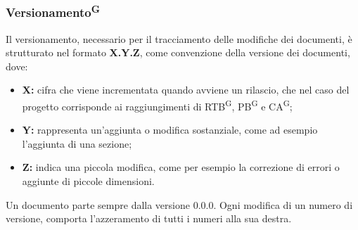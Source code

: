 \documentclass[8pt]{article}
\newcommand{\glossterm}[1]{#1\textsuperscript{G}} %
\begin{document}
\subsubsection{\glossterm{Versionamento}}
Il versionamento, necessario per il tracciamento delle modifiche dei documenti, è strutturato nel
formato \textbf{X.Y.Z}, come convenzione della versione dei documenti, dove:
\begin{itemize}
    \item \textbf{X:} cifra che viene incrementata quando avviene un rilascio, che nel caso del progetto corrisponde ai raggiungimenti di \glossterm{RTB}, \glossterm{PB} e \glossterm{CA};
    \item \textbf{Y:} rappresenta un'aggiunta o modifica sostanziale, come ad esempio l'aggiunta di una sezione;
    \item \textbf{Z:} indica una piccola modifica, come per esempio la correzione di errori o aggiunte di piccole dimensioni.
\end{itemize}
Un documento parte sempre dalla versione 0.0.0. Ogni modifica di un numero di versione, comporta l'azzeramento di tutti i numeri alla sua destra.
\end{document}
